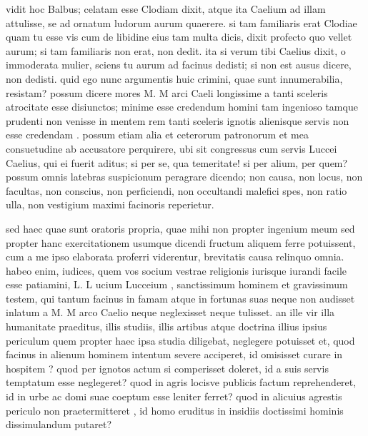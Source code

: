  vidit hoc Balbus; celatam esse Clodiam dixit, atque ita Caelium ad illam attulisse, se ad ornatum ludorum aurum quaerere. si tam familiaris erat Clodiae quam tu esse vis cum de libidine eius tam multa dicis, dixit profecto quo vellet aurum; si tam familiaris non erat, non dedit. ita si verum tibi Caelius dixit, o immoderata mulier, sciens tu aurum ad facinus dedisti; si non est ausus dicere, non dedisti. quid ego nunc argumentis huic crimini, quae sunt innumerabilia, resistam? possum dicere mores M. M arci Caeli longissime a tanti sceleris atrocitate esse disiunctos; minime esse credendum homini tam ingenioso tamque prudenti non venisse in mentem rem tanti sceleris ignotis alienisque servis non esse credendam . possum etiam alia et ceterorum patronorum et mea consuetudine ab accusatore perquirere, ubi sit congressus cum servis Luccei Caelius, qui ei fuerit aditus; si per se, qua temeritate! si per alium, per quem? possum omnis latebras suspicionum peragrare dicendo; non causa, non locus, non facultas, non conscius, non perficiendi, non occultandi malefici spes, non ratio ulla, non vestigium maximi facinoris reperietur.

 sed haec quae sunt oratoris propria, quae mihi non propter ingenium meum sed propter hanc exercitationem usumque dicendi fructum aliquem ferre potuissent, cum a me ipso elaborata proferri viderentur, brevitatis causa relinquo omnia. habeo enim, iudices, quem vos socium vestrae religionis iurisque iurandi facile esse patiamini, L. L ucium Lucceium , sanctissimum hominem et gravissimum testem, qui tantum facinus in famam atque in fortunas suas neque non audisset inlatum a M. M arco Caelio neque neglexisset neque tulisset. an ille vir illa humanitate praeditus, illis studiis, illis artibus atque doctrina illius ipsius periculum quem propter haec ipsa studia diligebat, neglegere potuisset et, quod facinus in alienum hominem intentum severe acciperet, id omisisset curare in hospitem ? quod per ignotos actum si comperisset doleret, id a suis servis temptatum esse neglegeret? quod in agris locisve publicis factum reprehenderet, id in urbe ac domi suae coeptum esse leniter ferret? quod in alicuius agrestis periculo non praetermitteret , id homo eruditus in insidiis doctissimi hominis dissimulandum putaret?

